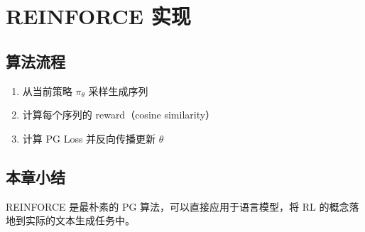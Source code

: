 \section{REINFORCE 实现}
\subsection{算法流程}
\begin{enumerate}
  \item 从当前策略 $\pi_\theta$ 采样生成序列
  \item 计算每个序列的 reward（cosine similarity）
  \item 计算 PG Loss 并反向传播更新 $\theta$
\end{enumerate}

\subsection{本章小结}
REINFORCE 是最朴素的 PG 算法，可以直接应用于语言模型，将 RL 的概念落地到实际的文本生成任务中。

